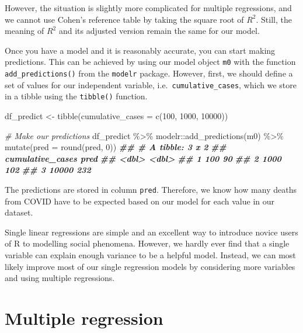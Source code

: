 \documentclass[
]{book}
\newenvironment{Shaded}{\begin{snugshade}}{\end{snugshade}}
\newcommand{\AttributeTok}[1]{\textcolor[rgb]{0.77,0.63,0.00}{#1}}
\newcommand{\CommentTok}[1]{\textcolor[rgb]{0.56,0.35,0.01}{\textit{#1}}}
\newcommand{\DecValTok}[1]{\textcolor[rgb]{0.00,0.00,0.81}{#1}}
\newcommand{\DocumentationTok}[1]{\textcolor[rgb]{0.56,0.35,0.01}{\textbf{\textit{#1}}}}
\newcommand{\FunctionTok}[1]{\textcolor[rgb]{0.00,0.00,0.00}{#1}}
\newcommand{\NormalTok}[1]{#1}
\newcommand{\OtherTok}[1]{\textcolor[rgb]{0.56,0.35,0.01}{#1}}
\newcommand{\SpecialCharTok}[1]{\textcolor[rgb]{0.00,0.00,0.00}{#1}}
\begin{document}
However, the situation is slightly more complicated for multiple regressions, and we cannot use Cohen's reference table by taking the square root of \(R^2\). Still, the meaning of \(R^2\) and its adjusted version remain the same for our model.

Once you have a model and it is reasonably accurate, you can start making predictions. This can be achieved by using our model object \texttt{m0} with the function \texttt{add\_predictions()} from the \texttt{modelr} package. However, first, we should define a set of values for our independent variable, i.e.~\texttt{cumulative\_cases}, which we store in a tibble using the \texttt{tibble()} function.

\begin{Shaded}
\begin{Highlighting}[]
\NormalTok{df\_predict }\OtherTok{\textless{}{-}}
  \FunctionTok{tibble}\NormalTok{(}\AttributeTok{cumulative\_cases =} \FunctionTok{c}\NormalTok{(}\DecValTok{100}\NormalTok{, }\DecValTok{1000}\NormalTok{, }\DecValTok{10000}\NormalTok{))}

\CommentTok{\# Make our predictions}
\NormalTok{df\_predict }\SpecialCharTok{\%\textgreater{}\%}
\NormalTok{  modelr}\SpecialCharTok{::}\FunctionTok{add\_predictions}\NormalTok{(m0) }\SpecialCharTok{\%\textgreater{}\%}
  \FunctionTok{mutate}\NormalTok{(}\AttributeTok{pred =} \FunctionTok{round}\NormalTok{(pred, }\DecValTok{0}\NormalTok{))}
\DocumentationTok{\#\# \# A tibble: 3 x 2}
\DocumentationTok{\#\#   cumulative\_cases  pred}
\DocumentationTok{\#\#              \textless{}dbl\textgreater{} \textless{}dbl\textgreater{}}
\DocumentationTok{\#\# 1              100    90}
\DocumentationTok{\#\# 2             1000   102}
\DocumentationTok{\#\# 3            10000   232}
\end{Highlighting}
\end{Shaded}

The predictions are stored in column \texttt{pred}. Therefore, we know how many deaths from COVID have to be expected based on our model for each value in our dataset.

Single linear regressions are simple and an excellent way to introduce novice users of R to modelling social phenomena. However, we hardly ever find that a single variable can explain enough variance to be a helpful model. Instead, we can most likely improve most of our single regression models by considering more variables and using multiple regressions.

\hypertarget{multiple-regression}{%
\section{Multiple regression}\label{multiple-regression}}
\end{document}

